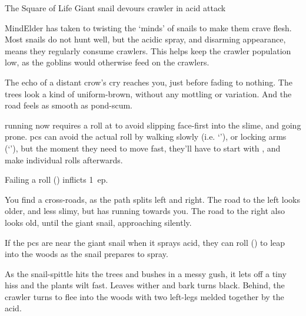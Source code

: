\label{ravencopsIntro}

{The Square of Life}%
{Giant snail devours \gls{crawler} in acid attack}%

\begin{exampletext}
  \Gls{MindElder} has taken to twisting the `minds' of snails to make them crave flesh.
  Most snails do not hunt well, but the acidic spray, and disarming appearance, means they regularly consume \glspl{crawler}.
  This helps keep the \gls{crawler} population low, as the goblins would otherwise feed on the \glspl{crawler}.
\end{exampletext}

\begin{boxtext}
  The echo of a distant crow's cry reaches you, just before fading to nothing.
  The trees look a kind of uniform-brown, without any mottling or variation.
  And the road feels as smooth as pond-scum.
\end{boxtext}

\Gls{running} now requires a  roll at \tn[7] to avoid slipping face-first into the slime, and going prone.%
\Glspl{pc} can avoid the actual roll by walking slowly (i.e. `'), or locking arms (`'), but the moment they need to move fast, they'll have to start with , and make individual rolls afterwards.

Failing a  roll (\tn[7]) inflicts 1~\gls{ep}.

\begin{boxtext}
  You find a cross-roads, as the path splits left and right.
  The road to the left looks older, and less slimy, but has  running towards you.
  The road to the right also looks old, until the giant snail, approaching silently.
\end{boxtext}

If the \glspl{pc} are near the giant snail when it sprays acid, they can roll  (\tn[7]) to leap into the woods as the snail prepares to spray.

\begin{boxtext}
  As the snail-spittle hits the trees and bushes in a messy gush, it lets off a tiny hiss and the plants wilt fast.
  Leaves wither and bark turns black.
  Behind, the \gls{crawler} turns to flee into the woods with two left-legs melded together by the acid.
\end{boxtext}

